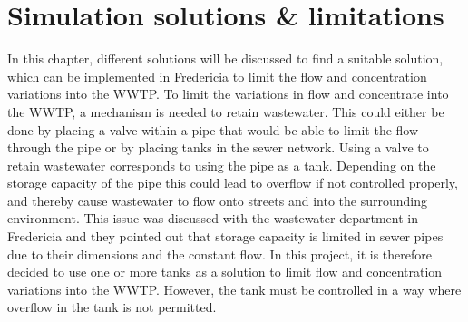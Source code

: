 
\chapter{Simulation solutions \& limitations }\label{ch:simulation_solution_and_limitation}
In this chapter, different solutions will be discussed to find a suitable solution, which can be implemented in Fredericia to limit the flow and concentration variations into the WWTP.
To limit the variations in flow and concentrate into the WWTP, a mechanism is needed to retain wastewater. This could either be done by placing a valve within a pipe that would be able to limit the flow through the pipe or by placing tanks in the sewer network.%
Using a valve to retain wastewater corresponds to using the pipe as a tank. Depending on the storage capacity of the pipe this could lead to overflow if not controlled properly, and thereby cause wastewater to flow onto streets and into the surrounding environment. %
This issue was discussed with the wastewater department in Fredericia and they pointed out that storage capacity is limited in sewer pipes due to their dimensions and the constant flow. 
In this project, it is therefore decided to use one or more tanks as a solution to limit flow and concentration variations into the WWTP. %
However, the tank must be controlled in a way where overflow in the tank is not permitted. %

